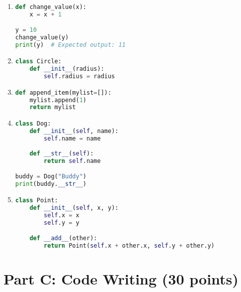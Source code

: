 \documentclass[11pt]{article}
\begin{document}
\begin{enumerate}[label=\arabic*.]
    \item \begin{lstlisting}[language=Python]
def change_value(x):
    x = x + 1

y = 10
change_value(y)
print(y)  # Expected output: 11
    \end{lstlisting}

    \item \begin{lstlisting}[language=Python]
class Circle:
    def __init__(radius):
        self.radius = radius
    \end{lstlisting}

    \item \begin{lstlisting}[language=Python]
def append_item(mylist=[]):
    mylist.append(1)
    return mylist
    \end{lstlisting}

    \item \begin{lstlisting}[language=Python]
class Dog:
    def __init__(self, name):
        self.name = name
    
    def __str__(self):
        return self.name

buddy = Dog("Buddy")
print(buddy.__str__)
    \end{lstlisting}

    \item \begin{lstlisting}[language=Python]
class Point:
    def __init__(self, x, y):
        self.x = x
        self.y = y

    def __add__(other):
        return Point(self.x + other.x, self.y + other.y)
    \end{lstlisting}
\end{enumerate}

\newpage

\section*{Part C: Code Writing (30 points)}
\end{document}
